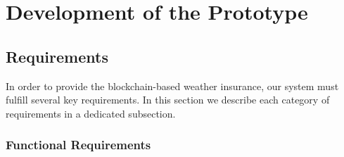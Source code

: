 \chapter{Development of the Prototype}\label{chapter:development_prototype}
\section{Requirements}\label{section:requirements}

In order to provide the blockchain-based weather insurance, our system must fulfill several key requirements. In this section we describe each category of requirements in a dedicated subsection.

\subsection{Functional Requirements}

